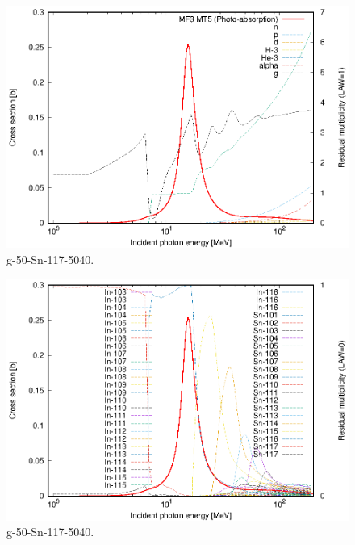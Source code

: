 \begin{figure}
 \includegraphics[width=\linewidth]{eps/g_50-Sn-117_5040.eps}
  \caption{g-50-Sn-117-5040.}
\end{figure}
\begin{figure}
 \includegraphics[width=\linewidth]{eps-law0/g_50-Sn-117_5040.eps}
 \caption{g-50-Sn-117-5040.}
\end{figure}
\newpage \clearpage

